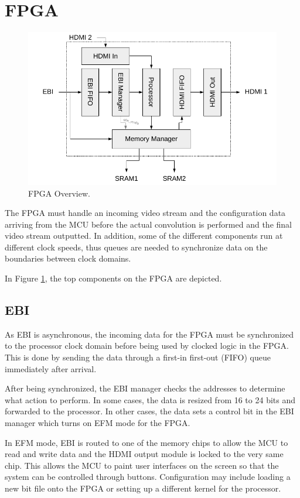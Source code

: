 \section{FPGA}
\begin{figure}
    \centering
    \includegraphics{img/FpgaOverview}
    \caption{FPGA Overview.}
    \label{fig:FpgaOverview}
\end{figure}

The FPGA must handle an incoming video stream and the configuration data arriving from the MCU before the actual convolution is performed and the final video stream outputted. In addition, some of the different components run at different clock speeds, thus queues are needed to synchronize data on the boundaries between clock domains.

In Figure \ref{fig:FpgaOverview}, the top components on the FPGA are depicted.

\subsection{EBI}
As EBI is asynchronous, the incoming data for the FPGA must be synchronized to the processor clock domain before being used by clocked logic in the FPGA.
This is done by sending the data through a first-in first-out (FIFO) queue immediately after arrival.

After being synchronized, the EBI manager checks the addresses to determine what action to perform. In some cases, the data is resized from 16 to 24 bits and forwarded to the processor. In other cases, the data sets a control bit in the EBI manager which turns on EFM mode for the FPGA.

In EFM mode, EBI is routed to one of the memory chips to allow the MCU to read and write data and the HDMI output module is locked to the very same chip.
This allows the MCU to paint user interfaces on the screen so that the system can be controlled through buttons.
Configuration may include loading a new bit file onto the FPGA or setting up a different kernel for the processor.

